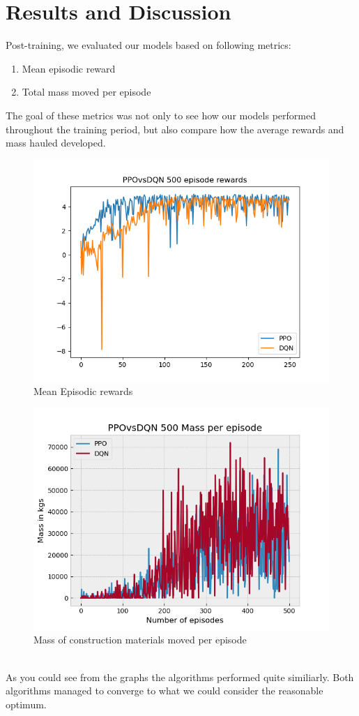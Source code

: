 \documentclass[conference]{IEEEtran}
\begin{document}
	\section{Results and Discussion}
	Post-training, we evaluated our models based on following metrics:
	\begin{enumerate}
		\item Mean episodic reward
		\item Total mass moved per episode
	\end{enumerate}
	The goal of these metrics was not only to see how our models performed throughout the training period, but also compare how the average rewards and mass hauled developed.
	\begin{figure}[h!]
		\includegraphics[width=\columnwidth]{graphs/PPOvsDQN250.png}
		\caption{Mean Episodic rewards}
	\end{figure}
	\begin{figure}[h!]
		\includegraphics[width=\columnwidth]{graphs/PPOvsDQN500mass.png}
		\caption{Mass of construction materials moved per episode}
	\end{figure}
	\\
	As you could see from the graphs the algorithms performed quite similiarly.
	Both algorithms managed to converge to what we could consider the reasonable optimum.
\end{document}
